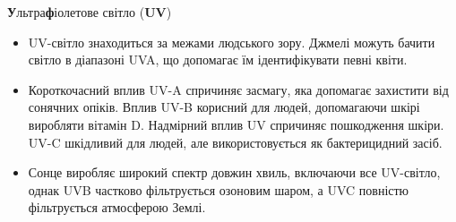 {\Large {\bfseries У}льтра{\bfseries ф}іолетове світло ({\bfseries UV})}
\begin{itemize}
\item UV-світло знаходиться за межами людського зору. Джмелі можуть бачити світло в діапазоні UVA, що допомагає їм ідентифікувати певні квіти.



\item Короткочасний вплив UV-A спричиняє засмагу, яка допомагає захистити від сонячних опіків. Вплив UV-B корисний для людей, допомагаючи шкірі виробляти вітамін D. Надмірний вплив UV спричиняє пошкодження шкіри. UV-C шкідливий для людей, але використовується як бактерицидний засіб.



\item Сонце виробляє широкий спектр довжин хвиль, включаючи все UV-світло, однак UVB частково фільтрується озоновим шаром, а UVC повністю фільтрується атмосферою Землі.

\end{itemize}





